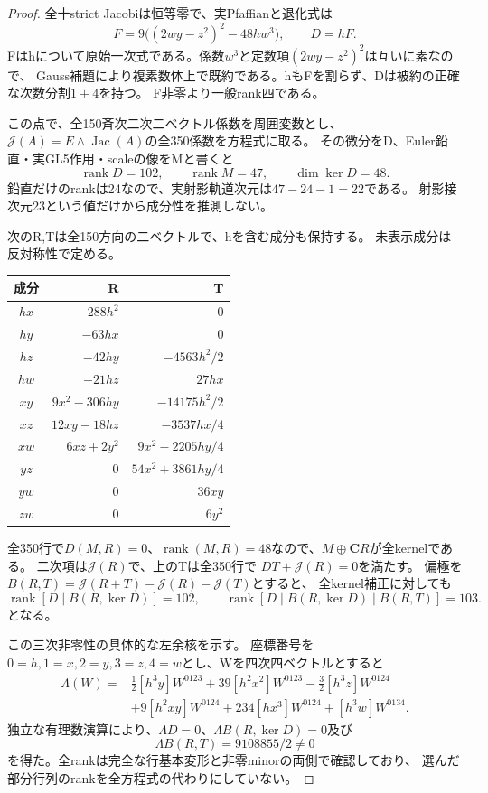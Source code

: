 \documentclass[a4paper,11pt]{ltjsarticle}
\theoremstyle{definition}
\newcommand{\CC}{\mathbf C}
\newcommand{\rank}{\operatorname{rank}}
\begin{document}
\begin{proof}
全十strict Jacobiは恒等零で、実Pfaffianと退化式は
\[
 F=9\bigl((2wy-z^2)^2-48hw^3\bigr),\qquad D=hF.
\]
Fはhについて原始一次式である。係数$w^3$と定数項$(2wy-z^2)^2$は互いに素なので、
Gauss補題により複素数体上で既約である。hもFを割らず、Dは被約の正確な次数分割$1+4$を持つ。
F非零より一般rank四である。

この点で、全150斉次二次二ベクトル係数を周囲変数とし、
$\mathcal J(A)=E\wedge\operatorname{Jac}(A)$の全350係数を方程式に取る。
その微分をD、Euler鉛直・実GL5作用・scaleの像をMと書くと
\[
 \rank D=102,\qquad\rank M=47,\qquad\dim\ker D=48.
\]
鉛直だけのrankは24なので、実射影軌道次元は$47-24-1=22$である。
射影接次元23という値だけから成分性を推測しない。

次のR,Tは全150方向の二ベクトルで、hを含む成分も保持する。
未表示成分は反対称性で定める。
\begin{center}\small
\begin{tabular}{c|r|r}
成分&R&T\\\hline
$hx$&$-288h^2$&0\\
$hy$&$-63hx$&0\\
$hz$&$-42hy$&$-4563h^2/2$\\
$hw$&$-21hz$&$27hx$\\
$xy$&$9x^2-306hy$&$-14175h^2/2$\\
$xz$&$12xy-18hz$&$-3537hx/4$\\
$xw$&$6xz+2y^2$&$9x^2-2205hy/4$\\
$yz$&0&$54x^2+3861hy/4$\\
$yw$&0&$36xy$\\
$zw$&0&$6y^2$
\end{tabular}
\end{center}
全350行で$D(M,R)=0$、$\rank(M,R)=48$なので、$M\oplus\CC R$が全kernelである。
二次項は$\mathcal J(R)$で、上のTは全350行で
$DT+\mathcal J(R)=0$を満たす。
偏極を$B(R,T)=\mathcal J(R+T)-\mathcal J(R)-\mathcal J(T)$とすると、
全kernel補正に対しても
\[
 \rank[D\mid B(R,\ker D)]=102,\qquad
 \rank[D\mid B(R,\ker D)\mid B(R,T)]=103.                    \tag{\star}
\]
となる。

この三次非零性の具体的な左余核を示す。
座標番号を$0=h,1=x,2=y,3=z,4=w$とし、Wを四次四ベクトルとすると
\[
\begin{aligned}
 \Lambda(W)={}&\tfrac12[h^3y]W^{0123}+39[h^2x^2]W^{0123}
       -\tfrac32[h^3z]W^{0124}\\
       &+9[h^2xy]W^{0124}+234[hx^3]W^{0124}+[h^3w]W^{0134}.
\end{aligned}
\]
独立な有理数演算により、$\Lambda D=0$、$\Lambda B(R,\ker D)=0$及び
\[
 \Lambda B(R,T)=9108855/2\ne0
\]
を得た。全rankは完全な行基本変形と非零minorの両側で確認しており、
選んだ部分行列のrankを全方程式の代わりにしていない。


\end{proof}
\end{document}
